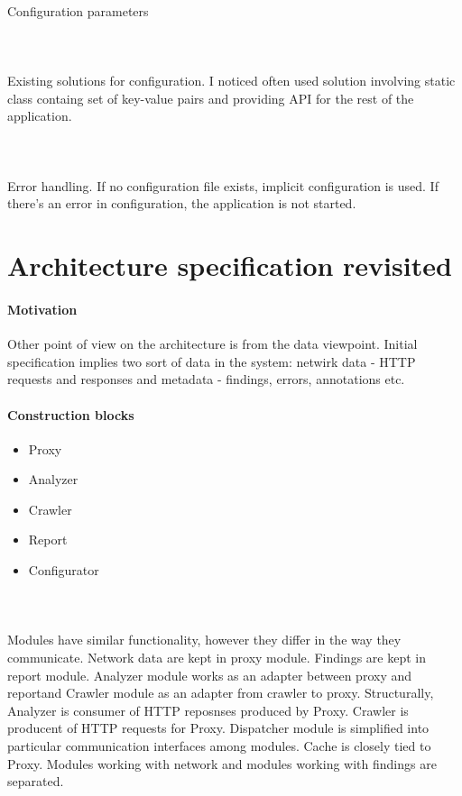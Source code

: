 \documentclass[10pt]{article}
\begin{document}
\paragraph{~}Configuration parameters
\paragraph{~}Existing solutions for configuration. I noticed often used solution involving static class containg set of key-value pairs and providing API for the rest of the application.
\paragraph{~}Error handling. If no configuration file exists, implicit configuration is used. If there's an error in configuration, the application is not started.
\section{Architecture specification revisited}
\paragraph{Motivation} Other point of view on the architecture is from the data viewpoint. Initial specification implies two sort of data in the system: netwirk data - HTTP requests and responses and metadata - findings, errors, annotations etc.
\paragraph{Construction blocks}
\begin{itemize}
	\item Proxy
	\item Analyzer
	\item Crawler
	\item Report
	\item Configurator
\end{itemize}
\paragraph{~}Modules have similar functionality, however they differ in the way they communicate. Network data are kept in proxy module. Findings are kept in report module. Analyzer module works as an adapter between proxy and reportand Crawler module as an adapter from crawler to proxy. Structurally, Analyzer is consumer of HTTP reposnses produced by Proxy. Crawler is producent of HTTP requests for Proxy. Dispatcher module is simplified into particular communication interfaces among modules. Cache is closely tied to Proxy. Modules working with network and modules working with findings are separated.
\end{document}
